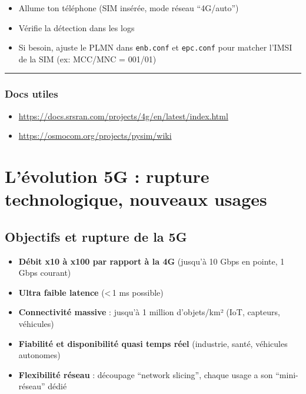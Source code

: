 \documentclass[
]{article}
\providecommand{\tightlist}{%
  \setlength{\itemsep}{0pt}\setlength{\parskip}{0pt}}
\begin{document}
\begin{itemize}
\tightlist
\item
  Allume ton téléphone (SIM insérée, mode réseau ``4G/auto'')
\item
  Vérifie la détection dans les logs
\item
  Si besoin, ajuste le PLMN dans \texttt{enb.conf} et \texttt{epc.conf}
  pour matcher l'IMSI de la SIM (ex: MCC/MNC = 001/01)
\end{itemize}

\begin{center}\rule{0.5\linewidth}{0.5pt}\end{center}

\subsubsection{Docs utiles}\label{docs-utiles}

\begin{itemize}
\tightlist
\item
  \url{https://docs.srsran.com/projects/4g/en/latest/index.html}
\item
  \url{https://osmocom.org/projects/pysim/wiki}
\end{itemize}

\section{L'évolution 5G : rupture technologique, nouveaux
usages}\label{luxe9volution-5g-rupture-technologique-nouveaux-usages}

\subsection{Objectifs et rupture de la
5G}\label{objectifs-et-rupture-de-la-5g}

\begin{itemize}
\tightlist
\item
  \textbf{Débit x10 à x100 par rapport à la 4G} (jusqu'à 10 Gbps en
  pointe, 1 Gbps courant)
\item
  \textbf{Ultra faible latence} (\textless\,1 ms possible)
\item
  \textbf{Connectivité massive} : jusqu'à 1 million d'objets/km² (IoT,
  capteurs, véhicules)
\item
  \textbf{Fiabilité et disponibilité quasi temps réel} (industrie,
  santé, véhicules autonomes)
\item
  \textbf{Flexibilité réseau} : découpage ``network slicing'', chaque
  usage a son ``mini-réseau'' dédié
\end{itemize}
\end{document}
